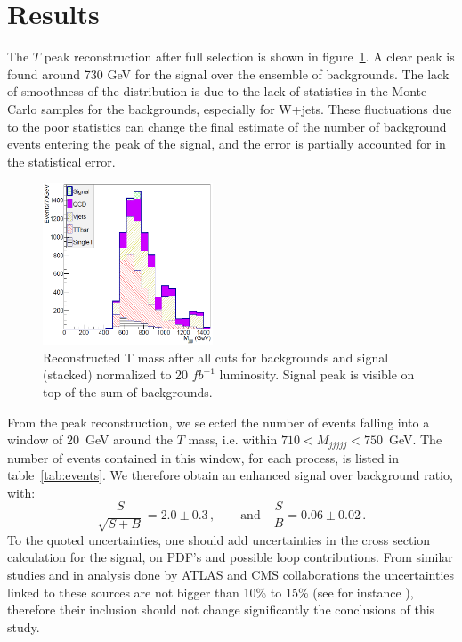 \section{Results}
\label{sec:Pres}

The $T$ peak reconstruction after full selection is shown in figure~\ref{fig:M5J}. A clear peak is found around 730 GeV for the signal over the ensemble of backgrounds. 
The lack of smoothness of the distribution is due to the lack of statistics in the Monte-Carlo samples for the  backgrounds, especially for W+jets. These fluctuations due to the poor statistics can change the final estimate of the number of background events entering the peak of the signal, and the error is partially accounted for in the statistical error. 

\begin{figure}[!Hhtbp]
  \begin{center}
    \includegraphics[width=0.45\textwidth]{figs/Pheno/Final.png}
    \caption{Reconstructed T mass after all cuts for backgrounds and signal (stacked) normalized to 20 $fb^{-1}$ luminosity. Signal peak is visible on top of the sum of backgrounds.}
    \label{fig:M5J}
  \end{center}
\end{figure}

From the peak reconstruction, we selected the number of events falling into a window of $20$~GeV around the $T$ mass, i.e. within $710 < M_{jjjjj} < 750$~GeV. The number of events contained in this window, for each process, is listed in table~\ref{tab:events}. We therefore obtain an enhanced signal over background ratio, with:
\begin{equation}
\frac{S}{\sqrt{S+B}}=2.0\pm 0.3\,, \qquad \mbox{and} \quad \frac{S}{B}=0.06\pm 0.02\,. 
\end{equation}
To the quoted uncertainties, one should add uncertainties in the cross section calculation for the signal, on PDF's and possible loop contributions. From similar studies and in analysis done by ATLAS and CMS collaborations the uncertainties linked to these sources are not bigger than 10\% to 15\% (see for instance \cite{Aad:2011yn}), therefore their inclusion should not change significantly the conclusions of this study.

